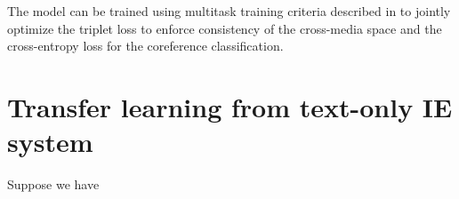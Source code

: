 \documentclass[11pt,a4paper]{article}
\newcommand{\bo}{\mathbf{o}}
\newcommand{\bw}{\mathbf{w}}
\begin{document}
The model can be trained using multitask training criteria described in \cite{Li2020-crossmedia-ie} to jointly optimize the triplet loss to enforce consistency of the cross-media space and the cross-entropy loss for the coreference classification.

\section{Transfer learning from text-only IE system}
Suppose we have 


\end{document}
